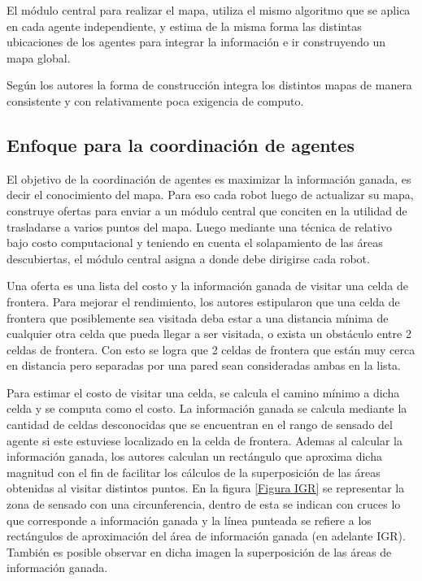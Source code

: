 \documentclass[runningheads]{llncs}
\begin{document}
El módulo central para realizar el mapa, utiliza el mismo algoritmo que se aplica en cada agente independiente, y estima de la misma forma las distintas ubicaciones de los agentes para integrar la información e ir construyendo un mapa global. 

Según los autores la forma de construcción integra los distintos mapas de manera consistente y con relativamente poca exigencia de computo.

\subsection{Enfoque para la coordinación de agentes}

El objetivo de la coordinación de agentes es maximizar la información ganada, es decir el conocimiento del mapa. Para eso cada robot luego de actualizar su mapa, construye ofertas para enviar a un módulo central que conciten en la utilidad de trasladarse a varios puntos del mapa. Luego mediante una técnica de relativo bajo costo computacional y teniendo en cuenta el solapamiento de las áreas descubiertas, el módulo central asigna a donde debe dirigirse cada robot. 

Una oferta es una lista del costo y la información ganada de visitar una celda de frontera. Para mejorar el rendimiento, los autores estipularon que una celda de frontera que posiblemente sea visitada deba estar a una distancia mínima de cualquier otra celda que pueda llegar a ser visitada, o exista un obstáculo entre 2 celdas de frontera. Con esto se logra que 2 celdas de frontera que están muy cerca en distancia pero separadas por una pared sean consideradas ambas en la lista.

Para estimar el costo de visitar una celda, se calcula el camino mínimo a dicha celda y se computa como el costo. La información ganada se calcula mediante la cantidad de celdas desconocidas que se encuentran en el rango de sensado del agente si este estuviese localizado en la celda de frontera. Ademas al calcular la información ganada, los autores calculan un rectángulo que aproxima dicha magnitud con el fin de facilitar los cálculos de la superposición de las áreas obtenidas al visitar distintos puntos. En la figura \ref{Figura IGR} se representar la zona de sensado con una circunferencia, dentro de esta se indican con cruces lo que corresponde a información ganada y la línea punteada se refiere a los rectángulos de aproximación del área de información ganada (en adelante IGR). También es posible observar en dicha imagen la superposición de las áreas de información ganada.
\end{document}
